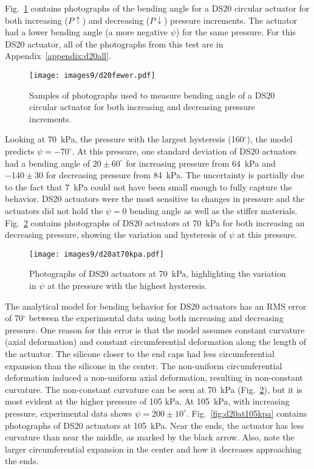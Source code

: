 Fig.~\ref{fig:d20fewer} contains photographs of the bending angle for a DS20 circular actuator for both increasing ($P\uparrow$) and decreasing ($P\downarrow$) pressure increments. The actuator had a lower bending angle (a more negative $\psi$) for the same pressure. For this DS20 actuator, all of the photographs from this test are in Appendix~\ref{appendix:d20all}. \\

\begin{figure}[!ht]
    \centering
    \texttt{[image: images9/d20fewer.pdf]}
    \caption{Samples of photographs used to measure bending angle of a DS20 circular actuator for both increasing and decreasing pressure increments.}
    \label{fig:d20fewer}
\end{figure}

\clearpage
Looking at 70~kPa, the pressure with the largest hysteresis (160$^\circ$), the model predicts $\psi=-70^\circ$. At this pressure, one standard deviation of DS20 actuators had a bending angle of $20\pm60^\circ$ for increasing pressure from 64~kPa and $-140\pm30$ for decreasing pressure from 84~kPa. The uncertainty is partially due to the fact that 7~kPa could not have been small enough to fully capture the behavior. DS20 actuators were the most sensitive to changes in pressure and the actuators did not hold the $\psi=0$ bending angle as well as the stiffer materials. Fig.~\ref{fig:d20at70kpa} contains photographs of DS20 actuators at 70~kPa for both increasing an decreasing pressure, showing the variation and hysteresis of $\psi$ at this pressure. \\

\begin{figure}[!ht]
    \centering
     \texttt{[image: images9/d20at70kpa.pdf]}
    \caption{Photographs of DS20 actuators at 70~kPa, highlighting the variation in $\psi$ at the pressure with the highest hysteresis. }
    \label{fig:d20at70kpa}
\end{figure}

The analytical model for bending behavior for DS20 actuators has an RMS error of 70$^\circ$ between the experimental data using both increasing and decreasing pressure. One reason for this error is that the model assumes constant curvature (axial deformation) and constant circumferential deformation along the length of the actuator. The silicone closer to the end caps had less circumferential expansion than the silicone in the center. The non-uniform circumferential deformation induced a non-uniform axial deformation, resulting in non-constant curvature. The non-constant curvature can be seen at 70~kPa (Fig.~\ref{fig:d20at70kpa}), but it is most evident at the higher pressure of 105 kPa. At 105~kPa, with increasing pressure, experimental data shows $\psi=200\pm10^\circ$. Fig.~\ref{fig:d20at105kpa} contains photographs of DS20 actuators at 105~kPa. Near the ends, the actuator has less curvature than near the middle, as marked by the black arrow. Also, note the larger circumferential expansion in the center and how it decreases approaching the ends. \\

